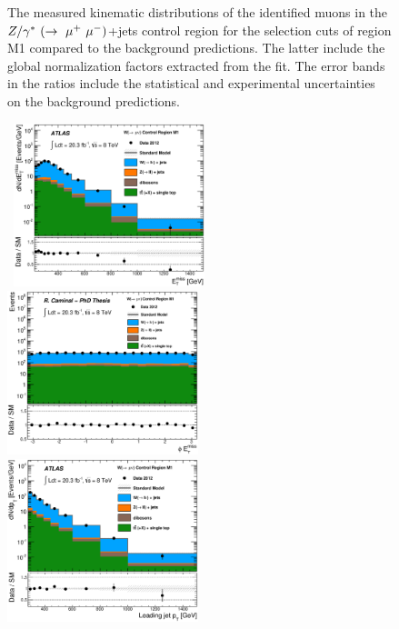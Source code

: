 \begin{figure}[!ht]
\begin{center}
{    }
  \end{center}
  \caption[Kinematic distributions of the identified muons in the $Z/\gamma^{\ast}(\rightarrow \mu^{+}\mu^{-})$+jets control region for the selection cuts of region M1, after the normalization factors extracted from the fit have been applied.]{The measured kinematic distributions of the identified muons in the $Z/\gamma^*~(\rightarrow~\mu^+~\mu^-)$+jets control region for the selection cuts of region M1 compared to the background predictions. The latter include the global normalization factors extracted from the fit. The error bands in the ratios include the statistical and experimental uncertainties on the background predictions.}
  \label{fig:Plot_M1_CRzmm_Leptonkinematics}
\end{figure}

\begin{figure}[!ht]
  \begin{center}
    \mbox{
      \includegraphics[width=0.495\textwidth]{MonojetAnalysis/Figures/plot_Stop_A6_CRwmn_met_fitted.eps}
      \includegraphics[width=0.495\textwidth]{MonojetAnalysis/Figures/plot_Stop_A6_CRwmn_met_phi_fitted.eps}
    }
    \mbox{
      \includegraphics[width=0.495\textwidth]{MonojetAnalysis/Figures/plot_Stop_A6_CRwmn_pt1_fitted.eps}
}
\end{center}
\end{figure}
